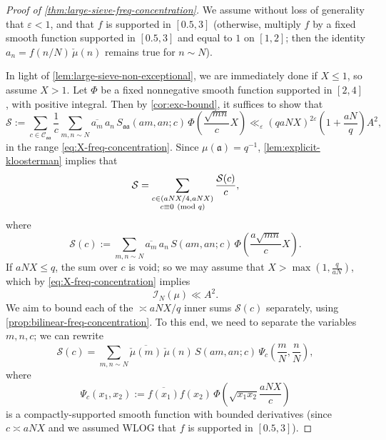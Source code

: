 \documentclass[reqno,11pt]{amsart}
\theoremstyle{remark}
\numberwithin{equation}{section}
\newcommand{\mC}{\mathcal{C}}
\newcommand{\mI}{\mathcal{I}}
\newcommand{\mS}{\mathcal{S}}
\newcommand{\ma}{\mathfrak{a}}
\newcommand{\eps}{\varepsilon}
\renewcommand{\bar}{\overline}
\renewcommand{\pmod}[1]{\ (\textnormal{mod } #1)}
\begin{document}
\begin{proof}[Proof of \cref{thm:large-sieve-freq-concentration}]
We assume without loss of generality that $\eps < 1$, and that $f$ is supported in $[0.5, 3]$ (otherwise, multiply $f$ by a fixed smooth function supported in $[0.5, 3]$ and equal to $1$ on $[1, 2]$; then the identity $a_n = f(n/N)\, \check{\mu}(n)$ remains true for $n \sim N$).

In light of \cref{lem:large-sieve-non-exceptional}, we are immediately done if $X \le 1$, so assume $X > 1$. Let $\Phi$ be a fixed nonnegative smooth function supported in $[2, 4]$, with positive integral. Then by \cref{cor:exc-bound}, it suffices to show that
\begin{equation} \label{eq:to-show-large-sieve}
    \mS := \sum_{c \in \mC_{\ma\ma}} \frac{1}{c} 
    \sum_{m,n \sim N} \bar{a_m}\, a_n\, S_{\ma \ma}(am, an; c)\, \Phi\left(\frac{\sqrt{mn}}{c} X \right)
    \ll_\eps 
    (qaNX)^{2\eps} \left(1 + \frac{aN}{q}\right) A^2,
\end{equation}
in the range \cref{eq:X-freq-concentration}. Since $\mu(\ma) = q^{-1}$, \cref{lem:explicit-kloosterman} implies that
\begin{equation} \label{eq:S-split}
    \mS = \sum_{\substack{c \in (aNX/4, aNX) \\ c \equiv 0 \pmod{q} \\ }} \frac{\mS(c)}{c},
\end{equation}
where 
\[
    \mS(c) := \sum_{m,n \sim N} \bar{a_m} \, a_n\, S(am, an; c)\, \Phi\left(\frac{a\sqrt{mn}}{c} X \right).
\]
If $aNX \le q$, the sum over $c$ is void; so we may assume that $X > \max\left(1, \frac{q}{aN}\right)$, which by \cref{eq:X-freq-concentration} implies
\begin{equation} \label{eq:wlog-conc}
    \mI_N(\mu) \ll A^2.
\end{equation}
We aim to bound each of the $\asymp aNX/q$ inner sums $\mS(c)$
separately, using \cref{prop:bilinear-freq-concentration}. To this end, we need to separate the variables $m, n, c$; we can rewrite
\begin{equation} \label{eq:sc-again}
    \mS(c) = \sum_{m,n \sim N} \bar{\check{\mu}(m)} \, \check{\mu}(n)\, S(am, an; c)\, \Psi_c\left(\frac{m}{N}, \frac{n}{N}\right),
\end{equation}
where 
\[
    \Psi_c(x_1, x_2) := \bar{f(x_1)} f(x_2)\, \Phi\left(\sqrt{x_1 x_2} \frac{aNX}{c} \right)
\]
is a compactly-supported smooth function with bounded derivatives (since $c \asymp aNX$ and we assumed WLOG that $f$ is supported in $[0.5, 3]$).

\end{proof}
\end{document}
